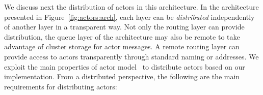 We discuss next the distribution of actors in this architecture.
In the architecture presented  in Figure~\ref{fig:actors:arch}, each layer can be \emph{distributed} independently of another layer in a transparent way.
Not only the routing layer can provide distribution, the queue layer of the architecture may also be remote to take advantage of cluster storage for actor messages. 
A remote routing layer can provide access to actors transparently through standard naming or addresses.
We exploit the main properties of actor model~\cite{Agha97,Agha90} to distribute actors based on our implementation.
From a distributed perspective, the following are the main requirements for  distributing actors:
